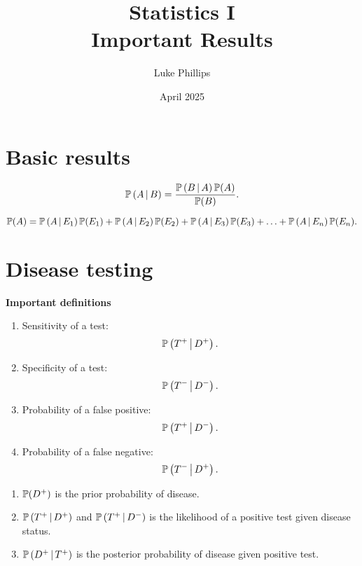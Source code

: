 \documentclass[10pt, a4paper]{article}
\title{Statistics I \\
    \large Important Results}
\author{Luke Phillips}
\date{April 2025}
\begin{document}
\maketitle

\newpage

\tableofcontents

\newpage

\section{Basic results}

\begin{theorem}
    \[
    \cP{A}{B} = \frac{\cP{B}{A}\P(A)}{\P(B)}.
    \]
\end{theorem}

\begin{theorem}
    \[
    \P(A) = \cP{A}{E_1}\P(E_1) + \cP{A}{E_2}\P(E_2) + \cP{A}{E_3}\P(E_3) + \dotsc + \cP{A}{E_n}\P(E_n).
    \]
\end{theorem}

\section{Disease testing}

\textbf{Important definitions}
\begin{enumerate}[label = (\roman*)]
    \item Sensitivity of a test:
    \[
    \cP{T ^ {+}}{D ^ {+}}.
    \]
    
    \item Specificity of a test:
    \[
    \cP{T ^ {-}}{D ^ {-}}.
    \]
    
    \item Probability of a false positive:
    \[
    \cP{T ^ {+}}{D ^ {-}}.
    \]
    
    \item Probability of a false negative:
    \[
    \cP{T ^ {-}}{D ^ {+}}.
    \]
\end{enumerate}

\begin{enumerate}[label = (\roman*)]
    \item $\P(D ^ {+})$ is the prior probability of disease.
    
    \item $\cP{T ^ {+}}{D ^ {+}}$ and $\cP{T ^ {+}}{D ^ {-}}$ is the likelihood of a positive test given disease status.
    
    \item $\cP{D ^ {+}}{T ^ {+}}$ is the posterior probability of disease given positive test.
\end{enumerate}
\end{document}

